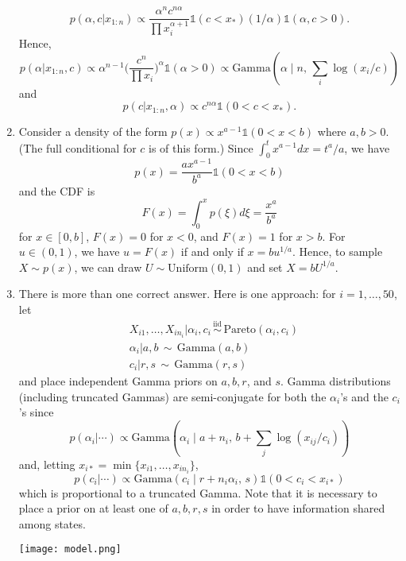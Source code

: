 \documentclass[11pt]{article}
\newcommand{\Ga}{\mathrm{Gamma}}
\newcommand{\Pareto}{\mathrm{Pareto}}
\newcommand{\Uniform}{\mathrm{Uniform}}
\newcommand{\I}{\mathds{1}}
\begin{document}
\begin{enumerate}
$$ p(\alpha,c|x_{1:n}) \propto \frac{\alpha^n c^{n\alpha}}{\prod x_i^{\alpha+1}}\I(c<x_*) (1/\alpha)\I(\alpha,c>0). $$
Hence,
$$ p(\alpha|x_{1:n},c) \propto \alpha^{n-1}\Big(\frac{c^n}{\prod x_i}\Big)^\alpha \I(\alpha>0) 
\propto \Ga(\alpha\mid n,\,\textstyle\sum_i \log(x_i/c)) $$
and 
$$ p(c|x_{1:n},\alpha) \propto c^{n\alpha}\I(0<c<x_*). $$
\item Consider a density of the form $p(x)\propto x^{a-1}\I(0<x<b)$ where $a,b>0$. (The full conditional for $c$ is of this form.) Since $\int_0^t x^{a-1} d x = t^a/a$, we have 
$$ p(x) = \frac{a x^{a-1}}{b^a}\I(0<x<b) $$
and the CDF is 
$$ F(x) = \int_0^x p(\xi)d\xi = \frac{x^a}{b^a} $$
for $x\in[0,b]$, $F(x) = 0$ for $x<0$, and $F(x) = 1$ for $x>b$. For $u\in(0,1)$, we have $u=F(x)$ if and only if $x = b u^{1/a}$. 
Hence, to sample $X\sim p(x)$, we can draw $U\sim\Uniform(0,1)$ and set $X = b U^{1/a}$.
\item There is more than one correct answer.  Here is one approach: for $i = 1,\ldots,50$, let
\begin{align*}
    & X_{i 1},\ldots,X_{i n_i}|\alpha_i,c_i\,\overset{\text{iid}}{\sim}\,\Pareto(\alpha_i,c_i)\\
    & \alpha_i|a,b \,\sim\, \Ga(a,b)\\
    & c_i|r,s\,\sim\, \Ga(r,s)
\end{align*}
and place independent Gamma priors on $a,b,r$, and $s$.
Gamma distributions (including truncated Gammas) are semi-conjugate for both the $\alpha_i$'s and the $c_i$'s since 
$$ p(\alpha_i|\cdots) \propto \Ga(\alpha_i\mid a+n_i,\, b + \textstyle\sum_j\log(x_{i j}/c_i)) $$
and, letting $x_{i *} = \min\{x_{i 1},\ldots,x_{i n_i}\}$, 
$$ p(c_i|\cdots) \propto \Ga(c_i\mid r + n_i\alpha_i,\, s)\I(0<c_i<x_{i *}) $$
which is proportional to a truncated Gamma.
Note that it is necessary to place a prior on at least one of $a,b,r,s$ in order to have information shared among states.

\begin{center}
\texttt{[image: model.png]}
\end{center}
\end{enumerate}
\end{document}
